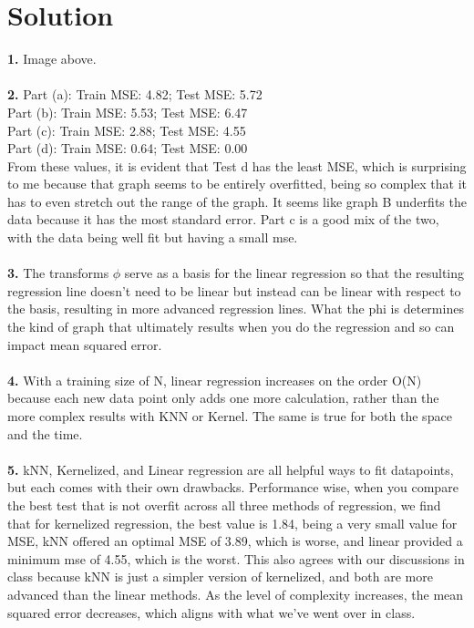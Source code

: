 \documentclass[submit]{harvardml}
\newenvironment{solution}
  {\color{blue}\section*{Solution}}
{}
\begin{document}
\begin{solution}
  \textbf{1.} Image above. \\\\

  \textbf{2.} Part (a): Train MSE: 4.82; Test MSE: 5.72 \\ Part (b): Train MSE: 5.53; Test MSE: 6.47 \\
  Part (c): Train MSE: 2.88; Test MSE: 4.55 \\ Part (d): Train MSE: 0.64; Test MSE: 0.00 \\
  From these values, it is evident that Test d has the least MSE, which is surprising to me because that graph seems to be entirely overfitted, 
  being so complex that it has to even stretch out the range of the graph. It seems like graph B underfits the data because it has the most standard 
  error. Part c is a good mix of the two, with the data being well fit but having a small mse. \\\\

  \textbf{3.} The transforms $\phi$ serve as a basis for the linear regression so that the resulting regression line doesn't need to be linear
  but instead can be linear with respect to the basis, resulting in more advanced regression lines. What the phi is determines the kind of 
  graph that ultimately results when you do the regression and so can impact mean squared error. \\\\

  \textbf{4.} With a training size of N, linear regression increases on the order O(N) because each new data point only adds one more calculation,
  rather than the more complex results with KNN or Kernel. The same is true for both the space and the time. \\\\

  \textbf{5.} kNN, Kernelized, and Linear regression are all helpful ways to fit datapoints, but each comes with their own drawbacks. Performance wise, 
  when you compare the best test that is not overfit across all three methods of regression, we find that for kernelized regression, the best value is 1.84, 
  being a very small value for MSE, kNN offered an optimal MSE of 3.89, which is worse, and linear provided a minimum mse of 4.55, which is the worst. 
  This also agrees with our discussions in class because kNN is just a simpler version of kernelized, and both are more advanced than the linear methods. 
  As the level of complexity increases, the mean squared error decreases, which aligns with what we've went over in class. 
 
\end{solution}
\end{document}
